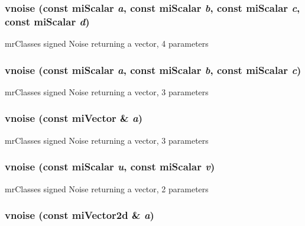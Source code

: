 \subsubsection{ vnoise (const mi\-Scalar {\em a}, const mi\-Scalar {\em b}, const mi\-Scalar {\em c}, const mi\-Scalar {\em d})\hspace{0.3cm}{\tt  [inline]}}\label{namespacersl_a82}


mr\-Classes signed Noise returning a vector, 4 parameters 

\subsubsection{ vnoise (const mi\-Scalar {\em a}, const mi\-Scalar {\em b}, const mi\-Scalar {\em c})\hspace{0.3cm}{\tt  [inline]}}\label{namespacersl_a81}


mr\-Classes signed Noise returning a vector, 3 parameters 

\subsubsection{ vnoise (const mi\-Vector \& {\em a})\hspace{0.3cm}{\tt  [inline]}}\label{namespacersl_a80}


mr\-Classes signed Noise returning a vector, 3 parameters 

\subsubsection{ vnoise (const mi\-Scalar {\em u}, const mi\-Scalar {\em v})\hspace{0.3cm}{\tt  [inline]}}\label{namespacersl_a79}


mr\-Classes signed Noise returning a vector, 2 parameters 

\subsubsection{ vnoise (const mi\-Vector2d \& {\em a})\hspace{0.3cm}{\tt  [inline]}}\label{namespacersl_a78}


